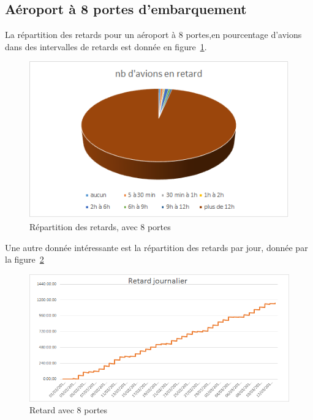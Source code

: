\begin{table}[h]
 \subsection{Aéroport à 8 portes d'embarquement}
La répartition des retards pour un aéroport à 8 portes,en pourcentage d'avions dans des intervalles de retards est donnée en figure~\ref{retard_camenbert_8}.
  \graphicspath{{donnees/graph_90jours/8portes/}}
    \begin{figure}[h!]
 \includegraphics[scale=0.6]{retard_avions.bmp}
  \caption{\label{retard_camenbert_8} Répartition des retards, avec 8 portes} 
 \end{figure}
 
 Une autre donnée intéressante est la répartition des retards par jour, donnée par la figure~\ref{retard_jour_8}
   \begin{figure}[h!]
 \includegraphics{retard_jour.bmp}
  \caption{\label{retard_jour_8} Retard avec 8 portes} 
 \end{figure}
 

\end{table}
